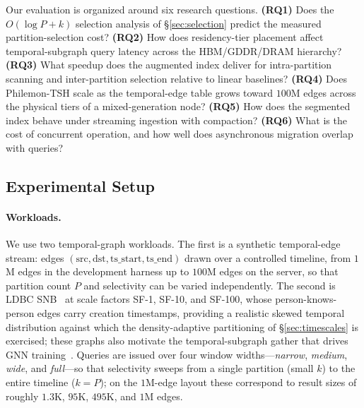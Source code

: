 \documentclass[10pt]{article}
\theoremstyle{definition}
\begin{document}
Our evaluation is organized around six research questions.
\textbf{(RQ1)} Does the $O(\log P + k)$ selection analysis of
\S\ref{sec:selection} predict the measured partition-selection cost?
\textbf{(RQ2)} How does residency-tier placement affect temporal-subgraph query
latency across the HBM/GDDR/DRAM hierarchy?
\textbf{(RQ3)} What speedup does the augmented index deliver for intra-partition
scanning and inter-partition selection relative to linear baselines?
\textbf{(RQ4)} Does Philemon-TSH scale as the temporal-edge table grows toward
$100$M edges across the physical tiers of a mixed-generation node?
\textbf{(RQ5)} How does the segmented index behave under streaming ingestion with
compaction?
\textbf{(RQ6)} What is the cost of concurrent operation, and how well does
asynchronous migration overlap with queries?

\subsection{Experimental Setup}
\label{sec:setup}

\paragraph{Workloads.}
We use two temporal-graph workloads. The first is a synthetic temporal-edge
stream: edges $(\text{src},\text{dst},\text{ts\_start},\text{ts\_end})$ drawn over
a controlled timeline, from $1$M edges in the development harness up to $100$M
edges on the server, so that partition count $P$ and selectivity can be varied
independently. The second is LDBC SNB~\citep{erling2015ldbc} at scale factors
SF-1, SF-10, and SF-100, whose person-knows-person edges carry creation
timestamps, providing a realistic skewed temporal distribution against which the
density-adaptive partitioning of \S\ref{sec:timescales} is exercised; these graphs
also motivate the temporal-subgraph gather that drives GNN
training~\citep{rossi2020tgn,hamilton2017graphsage}. Queries are issued over four
window widths---\emph{narrow}, \emph{medium}, \emph{wide}, and \emph{full}---so
that selectivity sweeps from a single partition (small $k$) to the entire timeline
($k=P$); on the $1$M-edge layout these correspond to result sizes of roughly
$1.3$K, $95$K, $495$K, and $1$M edges.
\end{document}
